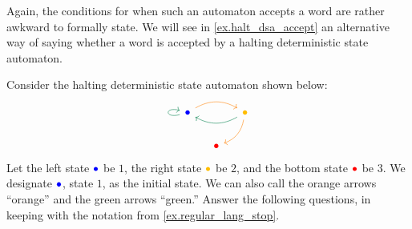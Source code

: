 \documentclass[Book-Poly]{subfiles}
\begin{document}

\begin{remark}
Again, the conditions for when such an automaton accepts a word are rather awkward to formally state.
We will see in \cref{ex.halt_dsa_accept} an alternative way of saying whether a word is accepted by a halting deterministic state automaton.
\end{remark}

\begin{exercise}\label{exc.halt_dsa}
Consider the halting deterministic state automaton shown below:
\begin{equation} \label{eqn.halt_dsa}
\begin{tikzcd}[column sep=small]
	\bul[blue]\ar[rr, bend left, orange]\ar[loop left, dgreen]&&
	\bul[dyellow]\ar[dl, bend left, orange]\ar[ll, dgreen, bend left]\\&
	\bul[red]
\end{tikzcd}
\end{equation}
Let the left state $\bul[blue]$ be $1$, the right state $\bul[dyellow]$ be $2$, and the bottom state $\bul[red]$ be $3$.
We designate $\bul[blue]$, state $1$, as the initial state.
We can also call the orange arrows ``{\color{orange}orange}'' and the green arrows ``{\color{dgreen}green}.''
Answer the following questions, in keeping with the notation from \cref{ex.regular_lang_stop}.


\end{exercise}
\end{document}
